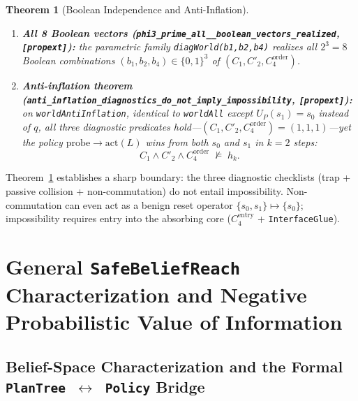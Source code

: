 \documentclass[10pt,a4paper]{article}
\theoremstyle{cleanthm}
\newtheorem{theorem}{Theorem}[section]
\theoremstyle{cleandef}
\begin{document}
\begin{theorem}[Boolean Independence and Anti-Inflation]
\label{thm:bool_anti}
\begin{enumerate}
  \item \textbf{All 8 Boolean vectors (\texttt{phi3\_\allowbreak prime\_\allowbreak all\_\_\allowbreak boolean\_\allowbreak vectors\_\allowbreak realized}, \texttt{[propext]}):} the parametric family \texttt{diagWorld(b1,b2,b4)} realizes all $2^3=8$ Boolean combinations $(b_1,b_2,b_4)\in\{0,1\}^3$ of $(C_1,C'_2,C_4^{\mathrm{order}})$.
  \item \textbf{Anti-inflation theorem (\texttt{anti\_\allowbreak inflation\_\allowbreak diagnostics\_\allowbreak do\_\allowbreak not\_\allowbreak imply\_\allowbreak impossibility}, \texttt{[propext]}):} on \texttt{worldAntiInflation}, identical to \texttt{worldAll} except $U_P(s_1)=s_0$ instead of $q$, all three diagnostic predicates hold—$(C_1,C'_2,C_4^{\mathrm{order}})=(1,1,1)$—yet the policy $\mathrm{probe}\to\mathrm{act}(L)$ wins from both $s_0$ and $s_1$ in $k=2$ steps:
  \begin{equation}
    C_1 \land C'_2 \land C_4^{\mathrm{order}} \;\not\models\; h_k.
  \end{equation}
\end{enumerate}
\end{theorem}

Theorem~\ref{thm:bool_anti} establishes a sharp boundary: the three diagnostic checklists (trap + passive collision + non-commutation) do not entail impossibility. Non-commutation can even act as a benign reset operator $\{s_0,s_1\}\mapsto\{s_0\}$; impossibility requires entry into the absorbing core ($C_4^{\mathrm{entry}}$ + \texttt{InterfaceGlue}).

\section{General \texorpdfstring{\texttt{SafeBeliefReach}}{SafeBeliefReach} Characterization and Negative Probabilistic Value of Information}

\subsection{Belief-Space Characterization and the Formal \texorpdfstring{\texttt{PlanTree}~$\leftrightarrow$~\texttt{Policy}}{PlanTree <-> Policy} Bridge}
\end{document}
